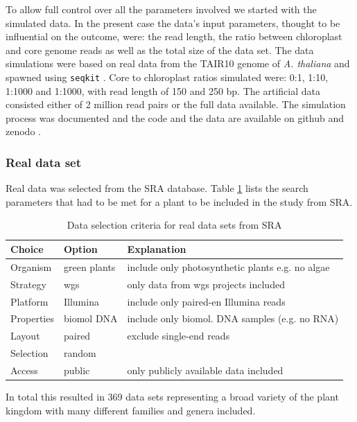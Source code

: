 To allow full control over all the parameters involved we started with the simulated data.
In the present case the data's input parameters, thought to be influential on the outcome,
were: the read length, the ratio between chloroplast and core genome reads as well as the
total size of the data set. The data simulations were based on real data from the TAIR10
genome of \textit{A. thaliana} \cite{tair10} and spawned using \texttt{seqkit}
\cite{seqkit}. Core to chloroplast ratios simulated were: 0:1, 1:10, 1:1000 and 1:1000,
with read length of 150 and 250 bp. The artificial data consisted either of 2 million read
pairs or the full data available. The simulation process was documented and the code and
the data are available on github and zenodo \cite{zenododataset}.

\subsubsection{Real data set}\label{sec:cp_real}

Real data was selected from the SRA database. Table \ref{tab:sra_real} lists the search
parameters that had to be met for a plant to be included in the study from SRA.

\onehalfspacing
\begin{table}[H]
\caption{Data selection criteria for real data sets from SRA}
\label{tab:sra_real}
\centering
\begin{tabular}{lll}
  \toprule
  Choice & Option & Explanation \\
  \midrule
   Organism   & green plants & include only photosynthetic plants e.g. no algae  \\
   Strategy   & wgs          & only data from wgs projects included \\
   Platform   & Illumina     & include only paired-en Illumina reads \\
   Properties & biomol DNA   & include only biomol. DNA samples (e.g. no RNA) \\
   Layout     & paired       & exclude single-end reads  \\
   Selection  & random       & \\
   Access     & public       & only publicly available data included \\
  \bottomrule                                       
\end{tabular}
\end{table}
\doublespacing
\noindent
In total this resulted in 369 data sets representing a broad variety of the plant kingdom with many different
families and genera included.

